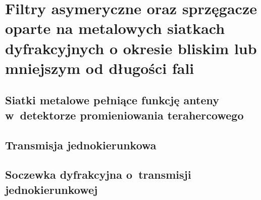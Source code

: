 \chapter{Filtry asymeryczne oraz \mbox{sprzęgacze} \mbox{oparte} na \mbox{metalowych} \mbox{siatkach} \mbox{dyfrakcyjnych} o \mbox{okresie} \mbox{bliskim} lub \mbox{mniejszym} od \mbox{długości} \mbox{fali}}
\label{chap:thz}


\section{Siatki metalowe pełniące funkcję anteny w~detektorze promieniowania terahercowego}


\section{Transmisja jednokierunkowa}

\section{Soczewka dyfrakcyjna o~transmisji jednokierunkowej}

